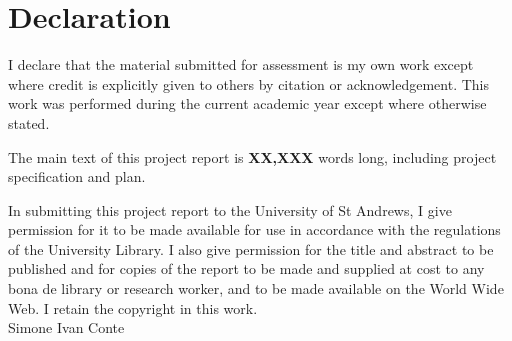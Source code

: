 \section{Declaration}
I declare that the material submitted for assessment is my own work except where credit is explicitly
given to others by citation or acknowledgement. This work was performed during the current academic
year except where otherwise stated.

The main text of this project report is \textbf{XX,XXX} words long, including project specification and plan.

In submitting this project report to the University of St Andrews, I give permission for it to be made
available for use in accordance with the regulations of the University Library. I also give permission for
the title and abstract to be published and for copies of the report to be made and supplied at cost to
any bona de library or research worker, and to be made available on the World Wide Web. I retain the
copyright in this work.
\\[2in]
Simone Ivan Conte
\newpage